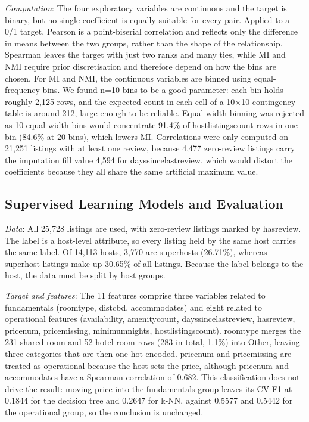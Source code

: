 \documentclass[final,1p,11pt]{elsarticle}
\renewcommand\_{\textunderscore\allowbreak}%
\begin{document}
\textit{Computation}: The four exploratory variables are continuous and the target is binary, but no single coefficient is equally suitable for every pair. Applied to a 0/1 target, Pearson is a point-biserial correlation and reflects only the difference in means between the two groups, rather than the shape of the relationship. Spearman leaves the target with just two ranks and many ties, while MI and NMI require prior discretisation and therefore depend on how the bins are chosen. For MI and NMI, the continuous variables are binned using equal-frequency bins. We found n=10 bins to be a good parameter: each bin holds roughly 2,125 rows, and the expected count in each cell of a 10×10 contingency table is around 212, large enough to be reliable. Equal-width binning was rejected as 10 equal-width bins would concentrate 91.4\% of host\_listings\_count rows in one bin (84.6\% at 20 bins), which lowers MI. Correlations were only computed on 21,251 listings with at least one review, because 4,477 zero-review listings carry the imputation fill value 4,594 for days\_since\_last\_review, which would distort the coefficients because they all share the same artificial maximum value.

\subsection{Supervised Learning Models and Evaluation}

\textit{Data}: All 25,728 listings are used, with zero-review listings marked by has\_review. The label is a host-level attribute, so every listing held by the same host carries the same label. Of 14,113 hosts, 3,770 are superhosts (26.71\%), whereas superhost listings make up 30.65\% of all listings. Because the label belongs to the host, the data must be split by host groups.

\textit{Target and features}: The 11 features comprise three variables related to fundamentals (room\_type\_3, dist\_cbd, accommodates) and eight related to operational features (availability\_365, amenity\_count, days\_since\_last\_review, has\_review, price\_num, price\_missing, minimum\_nights, host\_listings\_count). room\_type\_3 merges the 231 shared-room and 52 hotel-room rows (283 in total, 1.1\%) into Other, leaving three categories that are then one-hot encoded. price\_num and price\_missing are treated as operational because the host sets the price, although price\_num and accommodates have a Spearman correlation of 0.682. This classification does not drive the result: moving price into the fundamentals group leaves its CV F1 at 0.1844 for the decision tree and 0.2647 for k-NN, against 0.5577 and 0.5442 for the operational group, so the conclusion is unchanged.
\end{document}
